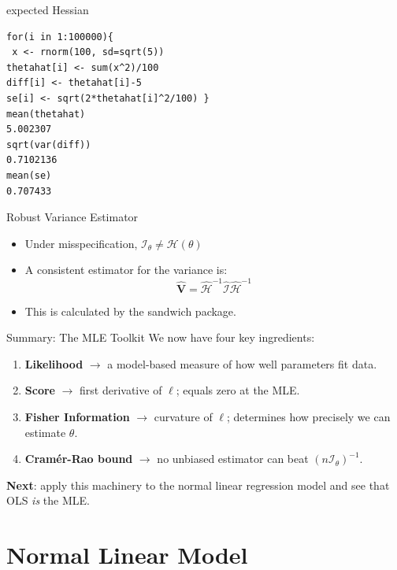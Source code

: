 \documentclass[aspectratio=169, handout, t]{beamer}
\numberwithin{equation}{section}
\begin{document}
\begin{frame}[fragile]{expected Hessian}
\begin{lstlisting}[style=Rstyle]
for(i in 1:100000){
 x <- rnorm(100, sd=sqrt(5))
thetahat[i] <- sum(x^2)/100 
diff[i] <- thetahat[i]-5 
se[i] <- sqrt(2*thetahat[i]^2/100) }
mean(thetahat)
5.002307 
sqrt(var(diff))
0.7102136
mean(se)
0.707433
\end{lstlisting}
\end{frame}


\begin{frame}{Robust Variance Estimator}

\begin{itemize}
\item Under misspecification, $\mathcal{I}_\theta\neq \mathcal{H}(\theta)$
\item A consistent estimator for the variance is:
$$\bm{\hat{V}}=\hat{\mathcal{H}}^{-1}\hat{\mathcal{I}}\hat{\mathcal{H}}^{-1}$$
\item This is calculated by the sandwich package.
 \end{itemize}
\end{frame}

\begin{frame}{Summary: The MLE Toolkit}
We now have four key ingredients:\pause
\begin{enumerate}\setlength{\itemsep}{4pt}
\item \textbf{Likelihood} $\to$ a model-based measure of how well parameters fit data.\pause
\item \textbf{Score} $\to$ first derivative of $\ell$; equals zero at the MLE.\pause
\item \textbf{Fisher Information} $\to$ curvature of $\ell$; determines how precisely we can estimate $\theta$.\pause
\item \textbf{Cram\'{e}r-Rao bound} $\to$ no unbiased estimator can beat $(n\mathcal{I}_\theta)^{-1}$.
\end{enumerate}\pause
\medskip
\textbf{Next}: apply this machinery to the normal linear regression model and see that OLS \emph{is} the MLE.
\end{frame}

\section{Normal Linear Model}
\end{document}
